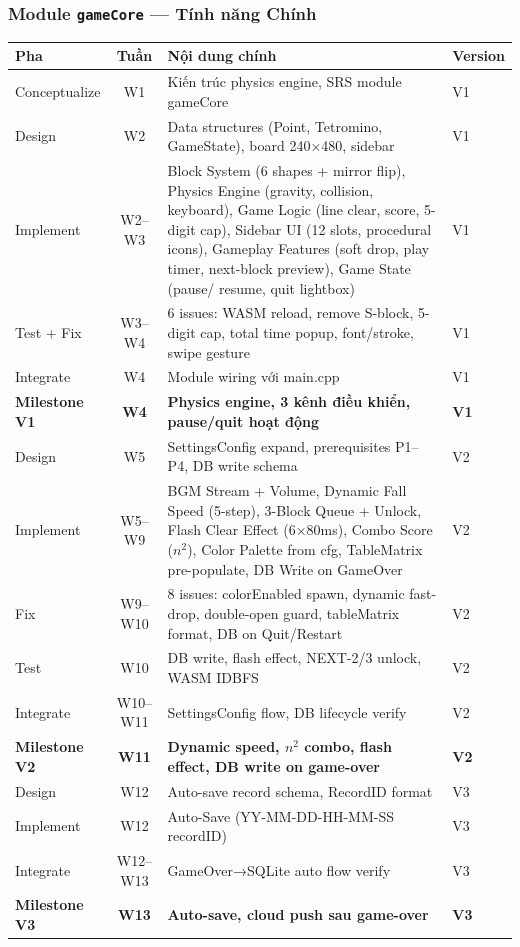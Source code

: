 \documentclass[12pt,a4paper]{article}
\begin{document}
\newpage %

\subsubsection{Module \texttt{gameCore} --- Tính năng Chính}

{\small
\begin{tabularx}{\linewidth}{|l|c|L|l|}
\hline
{}
\textbf{Pha} & \textbf{Tuần} & \textbf{Nội dung chính} & \textbf{Version} \\
\hline
Conceptualize & W1 & Kiến trúc physics engine, SRS module gameCore & V1 \\
\hline
Design & W2 & Data structures (Point, Tetromino, GameState), board 240×480, sidebar & V1 \\
\hline
Implement & W2--W3 & Block System (6 shapes + mirror flip), Physics Engine (gravity, collision, keyboard), Game Logic (line clear, score, 5-digit cap), Sidebar UI (12 slots, procedural icons), Gameplay Features (soft drop, play timer, next-block preview), Game State (pause/ resume, quit lightbox) & V1 \\
\hline
Test + Fix & W3--W4 & 6 issues: WASM reload, remove S-block, 5-digit cap, total time popup, font/stroke, swipe gesture & V1 \\
\hline
Integrate & W4 & Module wiring với main.cpp & V1 \\
\hline
{}
\textbf{Milestone V1} & \textbf{W4} & \textbf{Physics engine, 3 kênh điều khiển, pause/quit hoạt động} & \textbf{V1} \\
\hline
Design & W5 & SettingsConfig expand, prerequisites P1--P4, DB write schema & V2 \\
\hline
Implement & W5--W9 & BGM Stream + Volume, Dynamic Fall Speed (5-step), 3-Block Queue + Unlock, Flash Clear Effect (6×80ms), Combo Score ($n^2$), Color Palette from cfg, TableMatrix pre-populate, DB Write on GameOver & V2 \\
\hline
Fix & W9--W10 & 8 issues: colorEnabled spawn, dynamic fast-drop, double-open guard, tableMatrix format, DB on Quit/Restart & V2 \\
\hline
Test & W10 & DB write, flash effect, NEXT-2/3 unlock, WASM IDBFS & V2 \\
\hline
Integrate & W10--W11 & SettingsConfig flow, DB lifecycle verify & V2 \\
\hline
{}
\textbf{Milestone V2} & \textbf{W11} & \textbf{Dynamic speed, $n^2$ combo, flash effect, DB write on game-over} & \textbf{V2} \\
\hline
Design & W12 & Auto-save record schema, RecordID format & V3 \\
\hline
Implement & W12 & Auto-Save (YY-MM-DD-HH-MM-SS recordID) & V3 \\
\hline
Integrate & W12--W13 & GameOver→SQLite auto flow verify & V3 \\
\hline
{}
\textbf{Milestone V3} & \textbf{W13} & \textbf{Auto-save, cloud push sau game-over} & \textbf{V3} \\
\hline
\end{tabularx}
}
\end{document}

